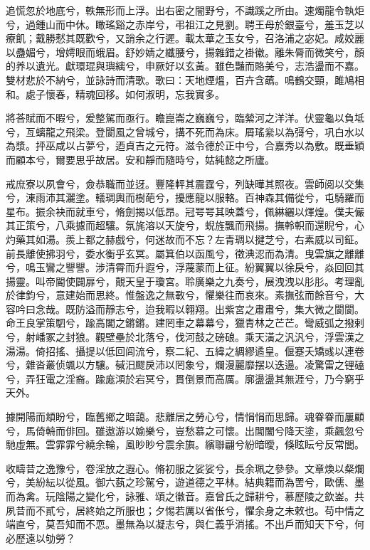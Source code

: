 \begin{pinyinscope}
追慌忽於地底兮，軼無形而上浮。出右密之闇野兮，不識蹊之所由。速燭龍令執炬兮，過鍾山而中休。瞰瑤谿之赤岸兮，弔祖江之見劉。聘王母於銀臺兮，羞玉芝以療飢；戴勝憖其既歡兮，又誚余之行遲。載太華之玉女兮，召洛浦之宓妃。咸姣麗以蠱媚兮，增嫮眼而蛾眉。舒妙婧之纖腰兮，揚雜錯之褂徽。離朱脣而微笑兮，顏的养以遺光。獻環琨與璵縭兮，申厥好以玄黃。雖色豔而賂美兮，志浩盪而不嘉。雙材悲於不納兮，並詠詩而清歌。歌曰：天地煙熅，百卉含蘤。鳴鶴交頸，雎鳩相和。處子懷春，精魂回移。如何淑明，忘我實多。

將荅賦而不暇兮，爰整駕而亟行。瞻崑崙之巍巍兮，臨縈河之洋洋。伏靈龜以負坻兮，亙螭龍之飛梁。登閬風之曾城兮，搆不死而為床。屑瑤繠以為彁兮，巩白水以為漿。抨巫咸以占夢兮，迺貞吉之元符。滋令德於正中兮，合嘉秀以為敷。既垂穎而顧本兮，爾要思乎故居。安和靜而隨時兮，姑純懿之所廬。

戒庶寮以夙會兮，僉恭職而並迓。豐隆軯其震霆兮，列缺曄其照夜。雲師阅以交集兮，涷雨沛其灑塗。轙琱輿而樹葩兮，擾應龍以服輅。百神森其備從兮，屯騎羅而星布。振余袂而就車兮，脩劍揭以低昂。冠咢咢其映蓋兮，佩綝纚以煇煌。僕夫儼其正策兮，八乘攄而超驤。氛旄溶以天旋兮，蜺旌飄而飛揚。撫軨軹而還睨兮，心灼藥其如湯。羨上都之赫戲兮，何迷故而不忘？左青琱以揵芝兮，右素威以司鉦。前長離使拂羽兮，委水衡乎玄冥。屬箕伯以函風兮，徵淟涊而為清。曳雲旗之離離兮，鳴玉鸞之譻譻。涉清霄而升遐兮，浮蔑蒙而上征。紛翼翼以徐戾兮，焱回回其揚靈。叫帝閽使闢扉兮，覿天皇于瓊宮。聆廣樂之九奏兮，展洩洩以肜肜。考理亂於律鈞兮，意建始而思終。惟盤逸之無斁兮，懼樂往而哀來。素撫弦而餘音兮，大容吟曰念哉。既防溢而靜志兮，迨我暇以翱翔。出紫宮之肅肅兮，集大微之閬閬。命王良掌策駟兮，踰高閣之鏘鏘。建罔車之幕幕兮，獵青林之芒芒。彎威弧之撥剌兮，射嶓冢之封狼。觀壁壘於北落兮，伐河鼓之磅硠。乘天潢之汎汎兮，浮雲漢之湯湯。倚招搖、攝提以低回闾流兮，察二紀、五緯之綢繆遹皇。偃蹇夭矯彧以連卷兮，雜沓叢侦颯以方驤。戫汨飂戾沛以罔象兮，爛漫麗靡摆以迭逿。凌驚雷之锂磕兮，弄狂電之淫裔。踰庬澒於宕冥兮，貫倒景而高厲。廓盪盪其無涯兮，乃今窮乎天外。

據開陽而頫盼兮，臨舊鄉之暗藹。悲離居之勞心兮，情悁悁而思歸。魂眷眷而屢顧兮，馬倚輈而俳回。雖遨游以媮樂兮，豈愁慕之可懷。出閶闔兮降天塗，乘飆忽兮馳虛無。雲霏霏兮繞余輪，風眇眇兮震余旟。繽聯翩兮紛暗曖，倏眩眃兮反常閭。

收疇昔之逸豫兮，卷淫放之遐心。脩初服之娑娑兮，長余珮之參參。文章煥以粲爛兮，美紛紜以從風。御六蓺之珍駕兮，遊道德之平林。結典籍而為罟兮，歐儒、墨而為禽。玩陰陽之變化兮，詠雅、頌之徽音。嘉曾氏之歸耕兮，慕歷陵之欽崟。共夙昔而不貳兮，居終始之所服也；夕惕若厲以省伥兮，懼余身之未敕也。苟中情之端直兮，莫吾知而不恧。墨無為以凝志兮，與仁義乎消搖。不出戶而知天下兮，何必歷遠以劬勞？


\end{pinyinscope}
